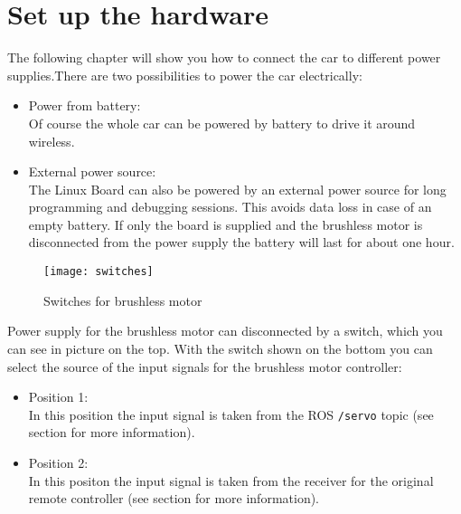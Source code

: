 %
%

\newcommand{\makro}[1]{\texttt{\textbackslash{}#1\{\}}}

\chapter{Set up the hardware}
\label{sec:setup}

The following chapter will show you how to connect the car to different power supplies.There are two possibilities to power the car electrically:

\begin{itemize}
		\item Power from battery:\\
					Of course the whole car can be powered by battery to drive it around wireless.
		\item External power source: \\
					The Linux Board can also be powered by an external power source for long programming and debugging sessions. This avoids data loss in case of an empty battery. If only the board is supplied and the brushless motor is disconnected from the power supply the battery will last for about one hour.					
\end{itemize}



\begin{wrapfigure}[13]{l}{0.35\textwidth}
  \begin{center}
    \texttt{[image: switches]}
		\caption{Switches for brushless motor}
		\label{fig:switches}
  \end{center}	
\end{wrapfigure} 

Power supply for the brushless motor can disconnected by a switch, which you can see in picture  on the top. With the switch shown on the bottom you can select the source of the input signals for the brushless motor controller:

\begin{itemize}
\item Position 1:\\
In this position the input signal is taken from the ROS \texttt{/servo} topic (see section  for more information).
\item Position 2:\\
In this positon the input signal is taken from the receiver for the original remote controller (see section  for more information).
\end{itemize}



